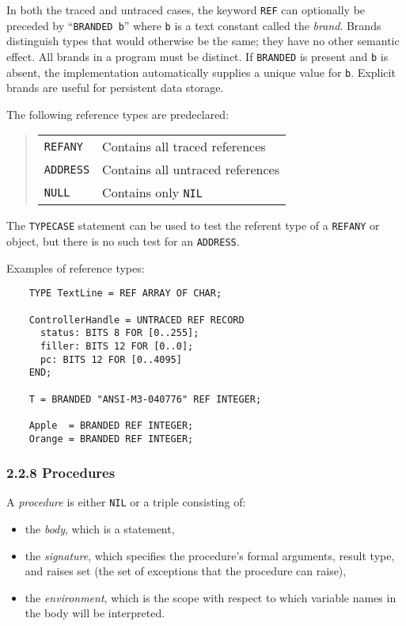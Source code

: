 \documentclass[10pt]{article}
\begin{document}
In both the traced and untraced cases, the keyword \verb|REF| can optionally
be preceded by ``\verb|BRANDED b|'' where \verb|b| is a text constant called
the \emph{brand}.  Brands distinguish types that would otherwise be the same;
they have no other semantic effect.  All brands in a program must be distinct.
If \verb|BRANDED| is present and \verb|b| is absent, the implementation
automatically supplies a unique value for \verb|b|.  Explicit brands are
useful for persistent data storage.

The following reference types are predeclared:
\begin{quote}
  \begin{tabular}{ll}
    \verb|REFANY|  & Contains all traced references \\
    \verb|ADDRESS| & Contains all untraced references \\
    \verb|NULL|    & Contains only \verb|NIL| \\
  \end{tabular}
\end{quote}
The \verb|TYPECASE| statement can be used to test the referent type of a
\verb|REFANY| or object, but there is no such test for an \verb|ADDRESS|.

Examples of reference types:
\begin{verbatim}
    TYPE TextLine = REF ARRAY OF CHAR;

    ControllerHandle = UNTRACED REF RECORD
      status: BITS 8 FOR [0..255];
      filler: BITS 12 FOR [0..0];
      pc: BITS 12 FOR [0..4095]
    END;

    T = BRANDED "ANSI-M3-040776" REF INTEGER;

    Apple  = BRANDED REF INTEGER;
    Orange = BRANDED REF INTEGER;
\end{verbatim}

\subsubsection*{2.2.8 Procedures}

A \emph{procedure} is either \verb|NIL| or a triple consisting of:
\begin{itemize}
\item the \emph{body}, which is a statement,
\item the \emph{signature}, which specifies the procedure's formal arguments,
  result type, and raises set (the set of exceptions that the procedure can
  raise),
\item the \emph{environment}, which is the scope with respect to which
  variable names in the body will be interpreted.
\end{itemize}
\end{document}
